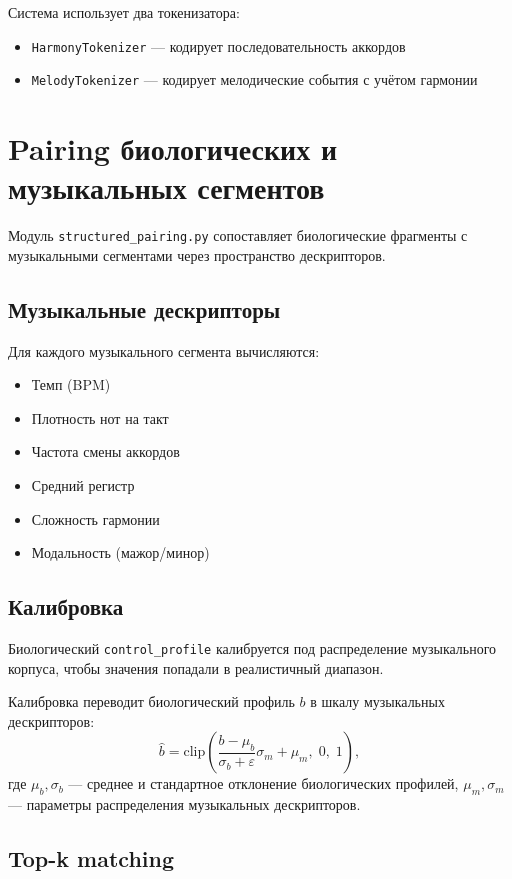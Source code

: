 Система использует два токенизатора:
\begin{itemize}
\item \texttt{HarmonyTokenizer} — кодирует последовательность аккордов
\item \texttt{MelodyTokenizer} — кодирует мелодические события с учётом гармонии
\end{itemize}

\section{Pairing биологических и музыкальных сегментов}

Модуль \texttt{structured\_pairing.py} сопоставляет биологические фрагменты с музыкальными сегментами через пространство дескрипторов.

\subsection{Музыкальные дескрипторы}

Для каждого музыкального сегмента вычисляются:
\begin{itemize}
\item Темп (BPM)
\item Плотность нот на такт
\item Частота смены аккордов
\item Средний регистр
\item Сложность гармонии
\item Модальность (мажор/минор)
\end{itemize}

\subsection{Калибровка}

Биологический \texttt{control\_profile} калибруется под распределение музыкального корпуса, чтобы значения попадали в реалистичный диапазон.

Калибровка переводит биологический профиль \(b\) в шкалу музыкальных дескрипторов:
\begin{equation}
\hat{b} = \mathrm{clip}\left(
\frac{b - \mu_b}{\sigma_b + \varepsilon}\sigma_m + \mu_m,\;0,\;1
\right),
\end{equation}
где \(\mu_b, \sigma_b\) — среднее и стандартное отклонение биологических профилей, \(\mu_m, \sigma_m\) — параметры распределения музыкальных дескрипторов.

\subsection{Top-k matching}

